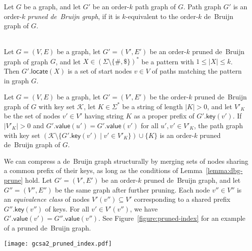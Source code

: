 \documentclass[twoside,leqno,twocolumn]{article}
\newcommand{\set}[1]{\ensuremath{\{ #1 \}}}
\newcommand{\abs}[1]{\ensuremath{\lvert #1 \rvert}}
\newcommand{\locate}{\ensuremath{\mathsf{locate}}}
\newcommand{\gkey}{\ensuremath{\mathsf{key}}}
\newcommand{\gvalue}{\ensuremath{\mathsf{value}}}
\newcommand{\kequivalent}[1]{$#1$\nobreakdash-equivalent}
\newcommand{\orderk}[1]{order\nobreakdash-$#1$}
\newcommand{\patternset}{\ensuremath{(\Sigma \setminus \set{\#, \$})^{\ast}}}
\begin{document}
\begin{Definition}
Let $G$ be a graph, and let $G'$ be an \orderk{k} path graph of $G$. Path graph $G'$ is an \orderk{k} \emph{pruned de~Bruijn graph}, if it is \kequivalent{k} to the \orderk{k} de~Bruijn graph of $G$.
\end{Definition}

\begin{lemma}\label{lemma:dbg-fp} ~\\
Let $G = (V, E)$ be a graph, let $G' = (V', E')$ be an \orderk{k} pruned de~Bruijn graph of graph $G$, and let $X \in \patternset$ be a pattern with $1 \le \abs{X} \le k$. Then $G'.\locate(X)$ is a set of start nodes $v\in V$ of paths matching the pattern in graph $G$.
\end{lemma}

\begin{lemma}[Pruning]\label{lemma:dbg-prune}
Let $G = (V, E)$ be a graph, let $G' = (V', E')$ be the \orderk{k} pruned de~Bruijn graph of $G$ with key set $\mathcal{K}$, let $K \in \Sigma^{\ast}$ be a string of length $\abs{K} > 0$, and let $V'_{K}$ be the set of nodes $v' \in V'$ having string $K$ as a proper prefix of $G'.\gkey(v')$.
If $\abs{V'_{K}} > 0$ and $G'.\gvalue(u') = G'.\gvalue(v')$ for all $u', v' \in V'_{K}$, the path graph with key set $(\mathcal{K} \setminus \set{ G'.\gkey(v') \mid v' \in V'_{K}}) \cup \set{K}$ is an \orderk{k} pruned de~Bruijn graph of $G$.
\end{lemma}

We can compress a de~Bruijn graph structurally by merging sets of nodes sharing a common prefix of their keys, as long as the conditions of Lemma~\ref{lemma:dbg-prune} hold. Let $G' = (V', E')$ be an \orderk{k} pruned de~Bruijn graph, and let $G'' = (V'', E'')$ be the same graph after further pruning. Each node $v'' \in V''$ is an \emph{equivalence class} of nodes $V'(v'') \subseteq V'$ corresponding to a shared prefix $G''.\gkey(v'')$ of keys. For all $v' \in V'(v'')$, we have $G'.\gvalue(v') = G''.\gvalue(v'')$. See Figure~\ref{figure:pruned-index} for an example of a pruned de~Bruijn graph.

\begin{figure*}[t!]
\texttt{[image: gcsa2\_pruned\_index.pdf]}
\caption{Left: An \protect\orderk{3} pruned de~Bruijn graph $G''$ \protect\kequivalent{3} to the de~Bruijn graph in Figure~\ref{figure:graph-dbg}. Right: GCSA for graph $G''$. Leftward arrows illustrate backward searching, with the red arrows showing it from $\mathtt{T}$ to $\mathtt{AT}$. Rightward arrows mark the samples belonging to each node, with the blue ones showing them for node $\mathtt{CAT}$.}\label{figure:pruned-index}
\end{figure*}
\end{document}
